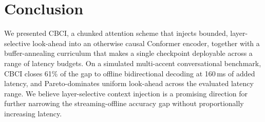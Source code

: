 \section{Conclusion}
We presented CBCI, a chunked attention scheme that injects bounded, layer-selective look-ahead into an
otherwise causal Conformer encoder, together with a buffer-annealing curriculum that makes a single
checkpoint deployable across a range of latency budgets. On a simulated multi-accent conversational
benchmark, CBCI closes 61\% of the gap to offline bidirectional decoding at 160\,ms of added latency,
and Pareto-dominates uniform look-ahead across the evaluated latency range. We believe layer-selective
context injection is a promising direction for further narrowing the streaming-offline accuracy gap
without proportionally increasing latency.
